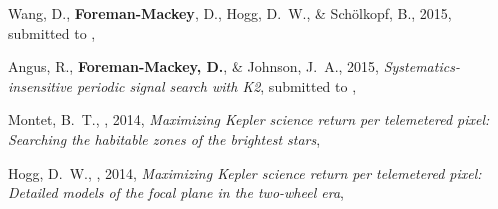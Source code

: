 \item Wang, D., {\bf Foreman-Mackey}, D., Hogg, D.~W., \& Sch{\"o}lkopf, B.,
    2015, submitted to \pasp, 

\item Angus, R., {\bf Foreman-Mackey, D.}, \& Johnson, J.~A., 2015,
    \emph{Systematics-insensitive periodic signal search with K2},
    submitted to \apj, 

\item Montet, B.~T., \etal, 2014,
    \emph{Maximizing Kepler science return per telemetered pixel: Searching
          the habitable zones of the brightest stars},

\item Hogg, D.~W., \etal, 2014,
    \emph{Maximizing Kepler science return per telemetered pixel: Detailed
          models of the focal plane in the two-wheel era},
